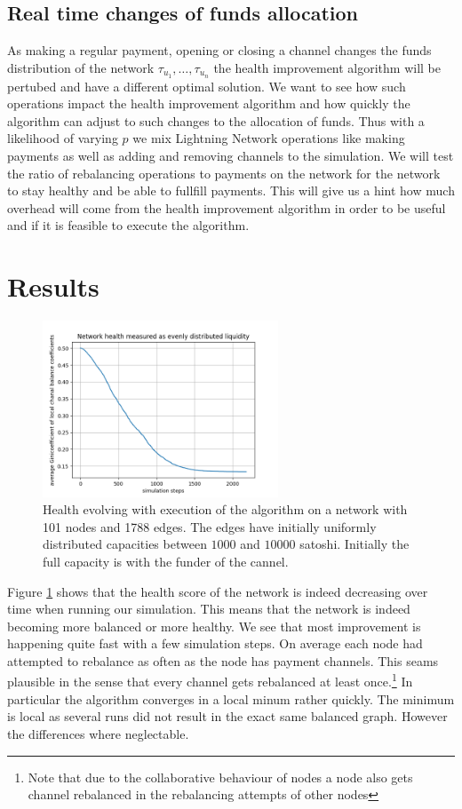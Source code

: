 \documentclass[a4paper]{paper}
\begin{document}
\subsection{Real time changes of funds allocation}
As making a regular payment, opening or closing a channel changes the funds distribution of the network $\tau_{u_1},\dots,\tau_{u_n}$ the health improvement algorithm will be pertubed and have a different optimal solution.
We want to see how such operations impact the health improvement algorithm and how quickly the algorithm can adjust to such changes to the allocation of funds.
Thus with a likelihood of varying $p$ we mix Lightning Network operations like making payments as well as adding and removing channels to the simulation.
We will test the ratio of rebalancing operations to payments on the network for the network to stay healthy and be able to fullfill payments.
This will give us a hint how much overhead will come from the health improvement algorithm in order to be useful and if it is feasible to execute the algorithm.

\section{Results}
\begin{figure}
 \centering
 \includegraphics[width=7cm]{code/results/routabilityTest/1574847007_figure.png}
 \caption{Health evolving with execution of the algorithm on a network with 101 nodes and 1788 edges. The edges have initially uniformly distributed capacities between $1000$ and $10000$ satoshi. Initially the full capacity is with the funder of the cannel.}
 \label{fig:healthovertime}
\end{figure}

Figure \ref{fig:healthovertime} shows that the health score of the network is indeed decreasing over time when running our simulation.
This means that the network is indeed becoming more balanced or more healthy.
We see that most improvement is happening quite fast with a few simulation steps.
On average each node had attempted to rebalance as often as the node has payment channels.
This seams plausible in the sense that every channel gets rebalanced at least once.\footnote{Note that due to the collaborative behaviour of nodes a node also gets channel rebalanced in the rebalancing attempts of other nodes} 
In particular the algorithm converges in a local minum rather quickly.
The minimum is local as several runs did not result in the exact same balanced graph.
However the differences where neglectable. 
\end{document}
